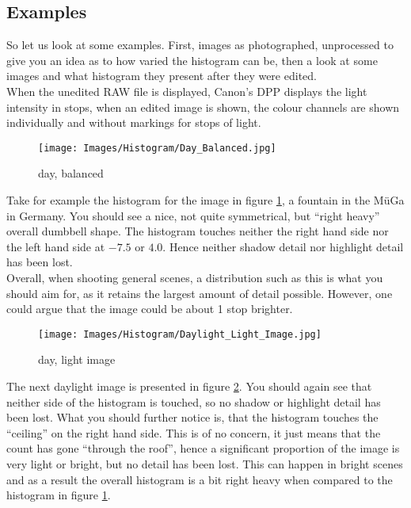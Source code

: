 \subsection{Examples}

So let us look at some examples. First, images as photographed, unprocessed to give you an idea as to how varied the histogram can be, then a look at some images and what histogram they present after they were edited.
\\
When the unedited RAW file is displayed, Canon's \gls{DPP} displays the light intensity in \glspl{stop}, when an edited image is shown, the colour channels are shown individually and without markings for stops of light.

\begin{figure}
	\centering
		\texttt{[image: Images/Histogram/Day\_Balanced.jpg]}
	\caption{day, balanced}
	\label{fig:Day_Balanced}
\end{figure}

Take for example the histogram for the image in figure \ref{fig:Day_Balanced}, a fountain in the M\"{u}Ga in Germany. You should see a nice, not quite symmetrical, but ``right heavy'' overall dumbbell shape. The histogram touches neither the right hand side nor the left hand side at $-7.5$ or $4.0$. Hence neither shadow detail nor highlight detail has been lost.
\\
Overall, when shooting general scenes, a distribution such as this is what you should aim for, as it retains the largest amount of detail possible. However, one could argue that the image could be about 1 \gls{stop} brighter.

\begin{figure}
	\centering
		\texttt{[image: Images/Histogram/Daylight\_Light\_Image.jpg]}
	\caption{day, light image}
	\label{fig:Daylight_Light_Image}
\end{figure}

The next daylight image is presented in figure \ref{fig:Daylight_Light_Image}. You should again see that neither side of the histogram is touched, so no shadow or highlight detail has been lost. What you should further notice is, that the histogram touches the ``ceiling'' on the right hand side. This is of no concern, it just means that the count has gone ``through the roof'', hence a significant proportion of the image is very light or bright, but no detail has been lost. This can happen in bright scenes and as a result the overall histogram is a bit right heavy when compared to the histogram in figure \ref{fig:Day_Balanced}.

